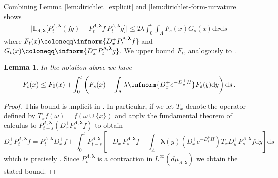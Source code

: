 \documentclass[10pt]{amsart}
\newtheorem{lemma}[theorem]{Lemma}
\theoremstyle{definition}
\theoremstyle{remark}
\newcommand{\blambda}{{\boldsymbol{\lambda}}}
\newcommand{\E}{\mathbb{E}}
\newcommand{\region}{\Lambda}
\newcommand{\activity}{\lambda}
\newcommand{\activities}{\pmb{\lambda}}
\newcommand{\diff}{\mathrm{d}}
\begin{document}
	Combining Lemma \ref{lem:dirichlet_explicit} and  \ref{lem:dirichlet-form-curvature} shows 
	\begin{align}
		\big|\E_{\region, \activities}\big[P_t^{\region, \activities}(f  g) - P_t^{\region, \activities}f \ P_t^{\region, \activities}g\big]\big| \le 
		2 \activity \int_0^t \int_\Lambda F_s(x) G_s(x) \diff x \diff s \label{eq:pure_magic}
	\end{align}
	where $F_t(x) \coloneqq \infnorm{D_x^+ P^{\region, \activities}_t f}$ and $G_t(x) \coloneqq \infnorm{D_x^+ P^{\region, \activities}_t g}$.  We upper bound $F_t$, analogously to \cite[Eq.~(4.8)]{bertini2002spectral}.
	
	\begin{lemma}
		In the notation above we have $$     F_t(x) \le F_0(x) + \int_{0}^{t} \left(F_s(x) + \int_{\region} \activity \infnorm{D_x^+ e^{- D_y^+ H}} F_s(y) \diff y \right) \diff s \,.$$
	\end{lemma}
	\begin{proof}
		This bound is implicit in \cite{bertini2002spectral}.  In particular, if we let $T_x$ denote the operator defined by $T_x f(\omega) = f(\omega \cup \{x\})$ and apply the fundamental theorem of calculus to $P_{t -s}^{\Lambda,\blambda}(D_x^+ P_s^{\Lambda,\blambda} f)$ to obtain \begin{equation*}
			D_x^+ P_t^{\Lambda,\blambda} f = P_t^{\Lambda,\blambda} D_x^+ f + \int_0^t P_{t - s}^{\Lambda,\blambda} \left[-D_x^+ P_s^{\Lambda,\blambda} f + \int_{\Lambda} \blambda(y) (D_x^+ e^{-D_y^+ H}) T_x D_y^+ P_s^{\Lambda,\blambda} f \diff y \right] \diff s
		\end{equation*}
		which is precisely \cite[Eq.~(4.7)]{bertini2002spectral}.  Since $P_t^{\Lambda,\blambda}$ is a contraction in $L^\infty(d\mu_{\Lambda,\blambda})$ we obtain the stated bound.
	\end{proof}
	
\end{document}
